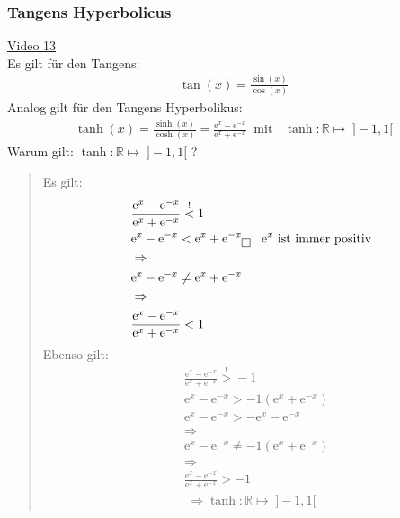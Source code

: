 \subsubsection{Tangens Hyperbolicus}
\href{https://youtu.be/cUg7vCA_ggw}{Video 13}\\
Es gilt für den Tangens:\\
\begin{align*}
\tan(x)=\frac{\sin(x)}{\cos(x)}
\end{align*}
Analog gilt für den Tangens Hyperbolikus:\\
\begin{align*}
\tanh(x)=\frac{\sinh(x)}{\cosh(x)}=\frac{\mathrm{e}^x-\mathrm{e}^{-x}}{\mathrm{e}^x+\mathrm{e}^{-x}}\;\;\text{mit }\;\;\tanh:\mathbb{R}\longmapsto\; ]-1,1[
\end{align*}
\newpage
\noindent
Warum gilt: $\tanh:\mathbb{R}\longmapsto\; ]-1,1[  $ ?
\begin{quote}
	\textbullet\;\;Es gilt: \\
	\begin{align*}
	&\frac{\mathrm{e}^x-\mathrm{e}^{-x}}{\mathrm{e}^x+\mathrm{e}^{-x}}\overset{!}{<}1\\
	&\mathrm{e}^x-\mathrm{e}^{-x}<\mathrm{e}^x+\mathrm{e}^{-x}\boxed{}\;\;\text{ $ \mathrm{e}^x $ ist immer positiv}\\
	&\Rightarrow\\
	&\mathrm{e}^x-\mathrm{e}^{-x}\neq\mathrm{e}^x+\mathrm{e}^{-x}\\
	&\Rightarrow\\
	&\frac{\mathrm{e}^x-\mathrm{e}^{-x}}{\mathrm{e}^x+\mathrm{e}^{-x}}<1
	\end{align*}
	\textbullet \;\;Ebenso gilt:\\
	\begin{align*}
	&\frac{\mathrm{e}^x-\mathrm{e}^{-x}}{\mathrm{e}^x+\mathrm{e}^{-x}}\overset{!}{>}-1\\
	&\mathrm{e}^x-\mathrm{e}^{-x}>-1(\mathrm{e}^x+\mathrm{e}^{-x})\\
	&\mathrm{e}^x-\mathrm{e}^{-x}>-\mathrm{e}^x-\mathrm{e}^{-x}\boxed{}\\
	&\Rightarrow\\
	&\mathrm{e}^x-\mathrm{e}^{-x}\neq-1(\mathrm{e}^x+\mathrm{e}^{-x})\\
	&\Rightarrow\\
	&\frac{\mathrm{e}^x-\mathrm{e}^{-x}}{\mathrm{e}^x+\mathrm{e}^{-x}}>-1
	\end{align*}
	\begin{align*}
	\Rightarrow \tanh:\mathbb{R}\longmapsto\; ]-1,1[
	\end{align*}
	
	
	
\end{quote}
